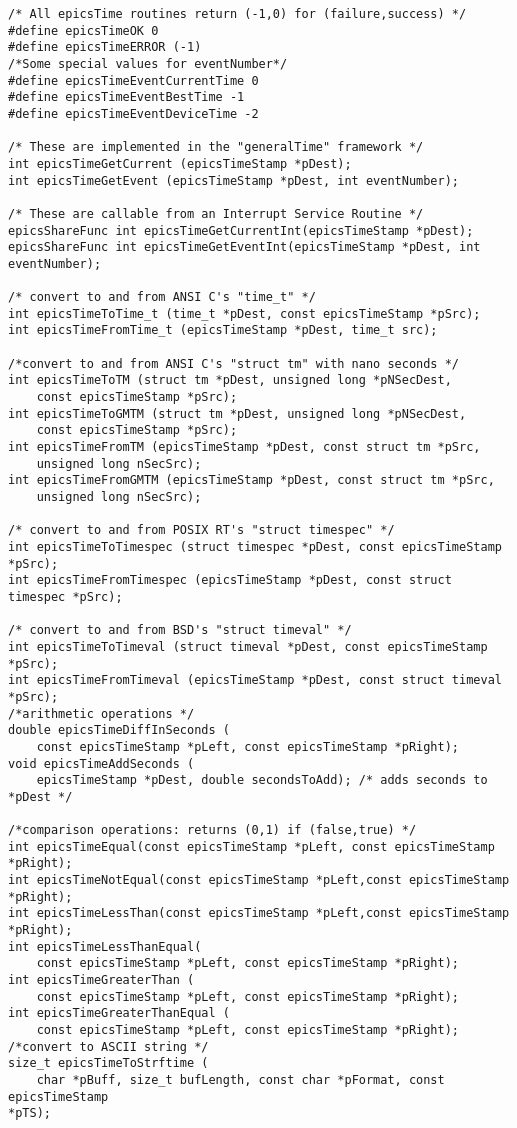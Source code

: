 \begin{verbatim}
/* All epicsTime routines return (-1,0) for (failure,success) */
#define epicsTimeOK 0
#define epicsTimeERROR (-1)
/*Some special values for eventNumber*/
#define epicsTimeEventCurrentTime 0
#define epicsTimeEventBestTime -1
#define epicsTimeEventDeviceTime -2

/* These are implemented in the "generalTime" framework */
int epicsTimeGetCurrent (epicsTimeStamp *pDest);
int epicsTimeGetEvent (epicsTimeStamp *pDest, int eventNumber);

/* These are callable from an Interrupt Service Routine */
epicsShareFunc int epicsTimeGetCurrentInt(epicsTimeStamp *pDest);
epicsShareFunc int epicsTimeGetEventInt(epicsTimeStamp *pDest, int eventNumber);

/* convert to and from ANSI C's "time_t" */
int epicsTimeToTime_t (time_t *pDest, const epicsTimeStamp *pSrc);
int epicsTimeFromTime_t (epicsTimeStamp *pDest, time_t src);

/*convert to and from ANSI C's "struct tm" with nano seconds */
int epicsTimeToTM (struct tm *pDest, unsigned long *pNSecDest,
    const epicsTimeStamp *pSrc);
int epicsTimeToGMTM (struct tm *pDest, unsigned long *pNSecDest,
    const epicsTimeStamp *pSrc);
int epicsTimeFromTM (epicsTimeStamp *pDest, const struct tm *pSrc,
    unsigned long nSecSrc);
int epicsTimeFromGMTM (epicsTimeStamp *pDest, const struct tm *pSrc,
    unsigned long nSecSrc);

/* convert to and from POSIX RT's "struct timespec" */
int epicsTimeToTimespec (struct timespec *pDest, const epicsTimeStamp *pSrc);
int epicsTimeFromTimespec (epicsTimeStamp *pDest, const struct timespec *pSrc);

/* convert to and from BSD's "struct timeval" */
int epicsTimeToTimeval (struct timeval *pDest, const epicsTimeStamp *pSrc);
int epicsTimeFromTimeval (epicsTimeStamp *pDest, const struct timeval *pSrc);
/*arithmetic operations */
double epicsTimeDiffInSeconds (
    const epicsTimeStamp *pLeft, const epicsTimeStamp *pRight);
void epicsTimeAddSeconds (
    epicsTimeStamp *pDest, double secondsToAdd); /* adds seconds to *pDest */

/*comparison operations: returns (0,1) if (false,true) */
int epicsTimeEqual(const epicsTimeStamp *pLeft, const epicsTimeStamp *pRight);
int epicsTimeNotEqual(const epicsTimeStamp *pLeft,const epicsTimeStamp *pRight);
int epicsTimeLessThan(const epicsTimeStamp *pLeft,const epicsTimeStamp *pRight);
int epicsTimeLessThanEqual(
    const epicsTimeStamp *pLeft, const epicsTimeStamp *pRight);
int epicsTimeGreaterThan (
    const epicsTimeStamp *pLeft, const epicsTimeStamp *pRight);
int epicsTimeGreaterThanEqual (
    const epicsTimeStamp *pLeft, const epicsTimeStamp *pRight);
/*convert to ASCII string */
size_t epicsTimeToStrftime (
    char *pBuff, size_t bufLength, const char *pFormat, const epicsTimeStamp 
*pTS);


\end{verbatim}
